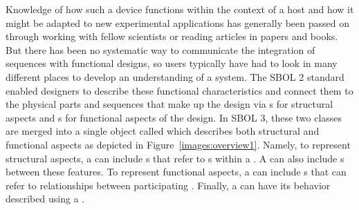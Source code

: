Knowledge of how such a device functions within the context of a host and how it might be adapted to new experimental applications has generally been passed on through working with fellow scientists or reading articles in papers and books. 
But there has been no systematic way to communicate the integration of sequences with functional designs, so users typically have had to look in many different places to develop an understanding of a system.  The SBOL 2 standard enabled designers to describe these functional characteristics and connect them to the physical parts and sequences that make up the design via s for structural aspects and s for functional aspects of the design.
In SBOL 3, these two classes are merged into a single object called  which describes both structural and functional aspects as depicted in Figure~\ref{images:overview1}.  Namely, to represent structural aspects, a  can include s that refer to s within a .  A  can also include s between these features.  To represent functional aspects, a  can include s that can refer to relationships between participating .  Finally, a  can have its behavior described using a .


